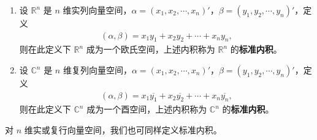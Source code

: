 \documentclass[../../main.tex]{subfiles}
\begin{document}
\begin{definition}[标准内积]
\begin{enumerate}
\item 设 \(\mathbb{R}^n\) 是 \(n\) 维实列向量空间，\(\alpha=(x_1,x_2,\cdots,x_n)'\)，\(\beta=(y_1,y_2,\cdots,y_n)'\)，定义
\begin{align*}
(\alpha,\beta)=x_1y_1 + x_2y_2+\cdots + x_ny_n,
\end{align*}
则在此定义下 \(\mathbb{R}^n\) 成为一个欧氏空间，上述内积称为 \(\mathbb{R}^n\) 的\textbf{标准内积}。

\item 设 \(\mathbb{C}^n\) 是 \(n\) 维复列向量空间，\(\alpha=(x_1,x_2,\cdots,x_n)'\)，\(\beta=(y_1,y_2,\cdots,y_n)'\)，定义
\begin{align*}
(\alpha,\beta)=x_1\overline{y_1}+x_2\overline{y_2}+\cdots + x_n\overline{y_n},
\end{align*}
则在此定义下 \(\mathbb{C}^n\) 成为一个酉空间，上述内积称为 \(\mathbb{C}^n\) 的\textbf{标准内积}。
\end{enumerate}
\end{definition}
\begin{remark}
对 \(n\) 维实或复行向量空间，我们也可同样定义标准内积。 
\end{remark}
\end{document}
